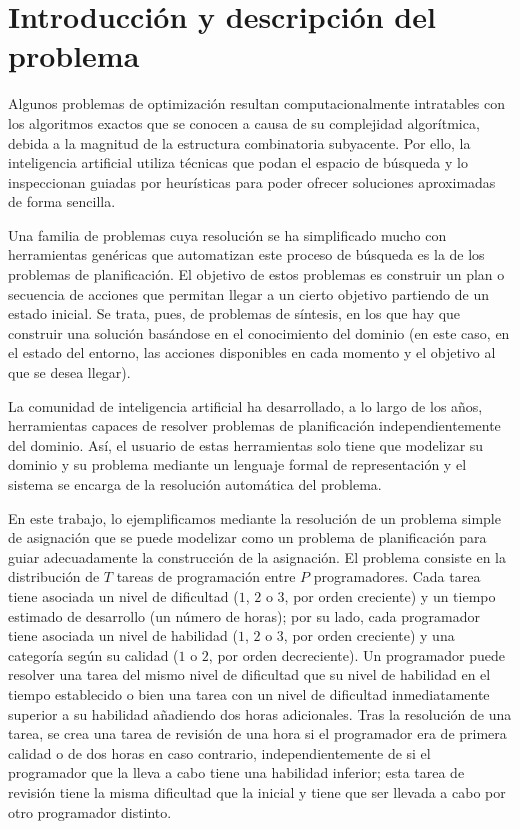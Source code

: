
\section{Introducción y descripción del problema} \label{sec:intro}

Algunos problemas de optimización resultan computacionalmente intratables con 
los algoritmos exactos que se conocen a causa de su complejidad algorítmica, 
debida a la magnitud de la estructura combinatoria subyacente. Por ello, la 
inteligencia artificial utiliza técnicas que podan el espacio de búsqueda y 
lo inspeccionan guiadas por heurísticas para poder ofrecer soluciones 
aproximadas de forma sencilla. 

Una familia de problemas cuya resolución se ha simplificado mucho con 
herramientas genéricas que automatizan este proceso de búsqueda es la de los 
problemas de planificación. El objetivo de estos problemas es construir un 
plan o secuencia de acciones que permitan llegar a un cierto objetivo 
partiendo de un estado inicial. Se trata, pues, de problemas de síntesis, en 
los que hay que construir una solución basándose en el conocimiento del 
dominio (en este caso, en el estado del entorno, las acciones disponibles en 
cada momento y el objetivo al que se desea llegar).

La comunidad de inteligencia artificial ha desarrollado, a lo largo de los 
años, herramientas capaces de resolver problemas de planificación 
independientemente del dominio. Así, el usuario de estas herramientas solo 
tiene que modelizar su dominio y su problema mediante un lenguaje formal de 
representación y el sistema se encarga de la resolución automática del 
problema. 

En este trabajo, lo ejemplificamos mediante la resolución de un problema 
simple de asignación que se puede modelizar como un problema de planificación 
para guiar adecuadamente la construcción de la asignación. El problema 
consiste en la distribución de \(T\) tareas de programación entre \(P\) 
programadores. Cada tarea tiene asociada un nivel de dificultad (\(1\), \(2\) 
o \(3\), por orden creciente) y un tiempo estimado de desarrollo (un número 
de horas); por su lado, cada programador tiene asociada un nivel de habilidad 
(\(1\), \(2\) o \(3\), por orden creciente) y una categoría según su calidad 
(\(1\) o \(2\), por orden decreciente). Un programador puede resolver una 
tarea del mismo nivel de dificultad que su nivel de habilidad en el tiempo 
establecido o bien una tarea con un nivel de dificultad inmediatamente 
superior a su habilidad añadiendo dos horas adicionales. Tras la resolución 
de una tarea, se crea una tarea de revisión de una hora si el programador era 
de primera calidad o de dos horas en caso contrario, independientemente de si 
el programador que la lleva a cabo tiene una habilidad inferior; esta tarea de 
revisión tiene la misma dificultad que la inicial y tiene que ser llevada a 
cabo por otro programador distinto.

